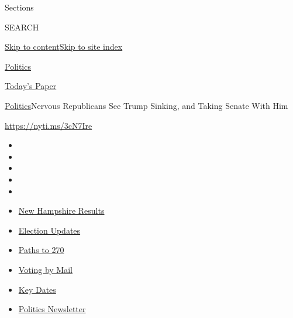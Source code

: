 Sections

SEARCH

\protect\hyperlink{site-content}{Skip to
content}\protect\hyperlink{site-index}{Skip to site index}

\href{https://www.nytimes3xbfgragh.onion/section/politics}{Politics}

\href{https://myaccount.nytimes3xbfgragh.onion/auth/login?response_type=cookie\&client_id=vi}{}

\href{https://www.nytimes3xbfgragh.onion/section/todayspaper}{Today's
Paper}

\href{/section/politics}{Politics}\textbar{}Nervous Republicans See
Trump Sinking, and Taking Senate With Him

\url{https://nyti.ms/3cN7Ire}

\begin{itemize}
\item
\item
\item
\item
\item
\end{itemize}

\begin{itemize}
\item
  \href{https://www.nytimes3xbfgragh.onion/interactive/2020/09/08/us/elections/results-new-hampshire-primary-elections.html?action=click\&pgtype=Article\&state=default\&region=TOP_BANNER\&context=storylines_menu}{New
  Hampshire Results}
\item
  \href{https://www.nytimes3xbfgragh.onion/live/2020/09/09/us/trump-vs-biden?action=click\&pgtype=Article\&state=default\&region=TOP_BANNER\&context=storylines_menu}{Election
  Updates}
\item
  \href{https://www.nytimes3xbfgragh.onion/interactive/2020/us/elections/election-states-biden-trump.html?action=click\&pgtype=Article\&state=default\&region=TOP_BANNER\&context=storylines_menu}{Paths
  to 270}
\item
  \href{https://www.nytimes3xbfgragh.onion/interactive/2020/08/31/us/politics/vote-by-mail-deadlines.html?action=click\&pgtype=Article\&state=default\&region=TOP_BANNER\&context=storylines_menu}{Voting
  by Mail}
\item
  \href{https://www.nytimes3xbfgragh.onion/interactive/2019/us/elections/2020-presidential-election-calendar.html?action=click\&pgtype=Article\&state=default\&region=TOP_BANNER\&context=storylines_menu}{Key
  Dates}
\item
  \href{https://www.nytimes3xbfgragh.onion/newsletters/politics?action=click\&pgtype=Article\&state=default\&region=TOP_BANNER\&context=storylines_menu}{Politics
  Newsletter}
\end{itemize}


